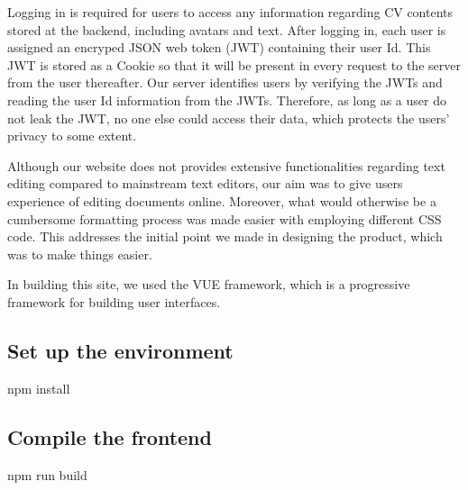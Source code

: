 \documentclass[11pt]{article}
\begin{document}
\begin{spacing}{1.0}
	Logging in is required for users to access any information regarding CV contents stored at the backend, including avatars and text. After logging in, each user is assigned an encryped JSON web token (JWT) containing their user Id. This JWT is stored as a Cookie so that it will be present in every request to the server from the user thereafter. Our server identifies users by verifying the JWTs and reading the user Id information from the JWTs. Therefore, as long as a user do not leak the JWT, no one else could access their data, which protects the users' privacy to some extent.
	
	Although our website does not provides extensive functionalities regarding text editing compared to mainstream text editors, our aim was to give users experience of editing documents online. Moreover, what would otherwise be a cumbersome formatting process was made easier with employing different CSS code. This addresses the initial point we made in designing the product, which was to make things easier.
	
	In building this site, we used the VUE framework, which is a progressive framework for building user interfaces. 
	
	\begin{center}
		
	\end{center}

	
	\subsection{Set up the environment}
	\hspace{\parindent}\hspace*{1cm}npm install
	\subsection{Compile the frontend}
	\hspace{\parindent}\hspace*{1cm}npm run build

\end{spacing}
\end{document}
